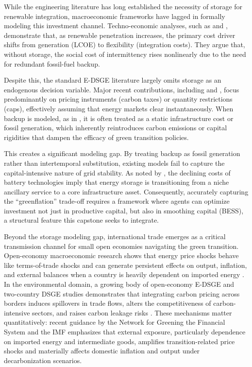 \documentclass[12pt, a4paper]{article}
\begin{document}
While the engineering literature has long established the necessity of storage for renewable integration, macroeconomic frameworks have lagged in formally modeling this investment channel. Techno-economic analyses, such as \citet{zakeri2015} and \citet{lund2015}, demonstrate that, as renewable penetration increases, the primary cost driver shifts from generation (LCOE) to flexibility (integration costs). They argue that, without storage, the social cost of intermittency rises nonlinearly due to the need for redundant fossil-fuel backup.

Despite this, the standard E-DSGE literature largely omits storage as an endogenous decision variable. Major recent contributions, including \citet{batten2020} and \citet{annicchiarico2021}, focus predominantly on pricing instruments (carbon taxes) or quantity restrictions (caps), effectively assuming that energy markets clear instantaneously. When backup is modeled, as in \citet{schreiner2020investing}, it is often treated as a static infrastructure cost or fossil generation, which inherently reintroduces carbon emissions or capital rigidities that dampen the efficacy of green transition policies.

This creates a significant modeling gap. By treating backup as fossil generation rather than intertemporal substitution, existing models fail to capture the capital-intensive nature of grid stability. As noted by \citet{kittner2017}, the declining costs of battery technologies imply that energy storage is transitioning from a niche ancillary service to a core infrastructure asset. Consequently, accurately capturing the ``greenflation'' trade-off requires a framework where agents can optimize investment not just in productive capital, but also in smoothing capital (BESS), a structural feature this capstone seeks to integrate.

Beyond the storage modeling gap, international trade emerges as a critical transmission channel for small open economies navigating the green transition. Open-economy macroeconomic research shows that energy price shocks behave like terms-of-trade shocks and can generate persistent effects on output, inflation, and external balances when a country is heavily dependent on imported energy \citep{obstfeld1995, corsetti2010}. In the environmental domain, a growing body of open-economy E-DSGE and two-country DSGE studies demonstrates that integrating carbon pricing across borders induces spillovers in trade flows, alters the competitiveness of carbon-intensive sectors, and raises carbon leakage risks \citep{bohringer2018, balke2022}. These mechanisms matter quantitatively: recent guidance by the Network for Greening the Financial System \citep{ngfs2022} and the IMF \citep{imf2021} emphasizes that external exposure, particularly dependence on imported energy and intermediate goods, amplifies transition-related price shocks and materially affects domestic inflation and output under decarbonization scenarios.
\end{document}
